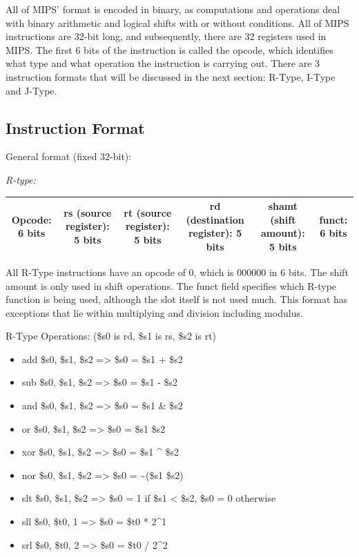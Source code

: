 \documentclass[
    paper=letter,
    parskip=half,
    fontsize=12pt,
    titlepage=firstiscover,
    toc=bibliography,
    numbers=endperiod
]{scrartcl}
\providecommand{\tightlist}{%
  \setlength{\itemsep}{0pt}\setlength{\parskip}{0pt}}
\begin{document}
All of MIPS' format is encoded in binary, as computations and operations
deal with binary arithmetic and logical shifts with or without
conditions. All of MIPS instructions are 32-bit long, and subsequently,
there are 32 registers used in MIPS. The first 6 bits of the instruction
is called the opcode, which identifies what type and what operation the
instruction is carrying out. There are 3 instruction formats that will
be discussed in the next section: R-Type, I-Type and J-Type.

\subsection{Instruction Format}

General format (fixed 32-bit):

\emph{R-type:}

\begin{tabularx}{\textwidth}{|C|C|C|C|C|C|}
    \hline
    Opcode: 6 bits & rs (source register): 5 bits & rt (source register): 5 bits & rd (destination register): 5 bits & shamt (shift amount): 5 bits & funct: 6 bits \\
    \hline
\end{tabularx}

All R-Type instructions have an opcode of 0, which is 000000 in 6 bits.
The shift amount is only used in shift operations. The funct field
specifies which R-type function is being used, although the slot itself
is not used much. This format has exceptions that lie within multiplying
and division including modulus.

R-Type Operations: (\$s0 is rd, \$s1 is rs, \$s2 is rt)

\begin{itemize}
    \tightlist
    \item add \$s0, \$s1, \$s2 =\textgreater{} \$s0 = \$s1 + \$s2
    \item sub \$s0, \$s1, \$s2 =\textgreater{} \$s0 = \$s1 - \$s2
    \item and \$s0, \$s1, \$s2 =\textgreater{} \$s0 = \$s1 \& \$s2
    \item or \$s0, \$s1, \$s2 =\textgreater{} \$s0 = \$s1 \textbar{} \$s2
    \item xor \$s0, \$s1, \$s2 =\textgreater{} \$s0 = \$s1 \^{} \$s2
    \item nor \$s0, \$s1, \$s2 =\textgreater{} \$s0 = \textasciitilde(\$s1 \textbar{} \$s2)
    \item slt \$s0, \$s1, \$s2 =\textgreater{} \$s0 = 1 if \$s1 \textless{} \$s2, \$s0 = 0 otherwise
    \item sll \$s0, \$t0, 1 =\textgreater{} \$s0 = \$t0 * 2\^{}1 \item srl \$s0, \$t0, 2 =\textgreater{} \$s0 = \$t0 / 2\^{}2
\end{itemize}
\end{document}

